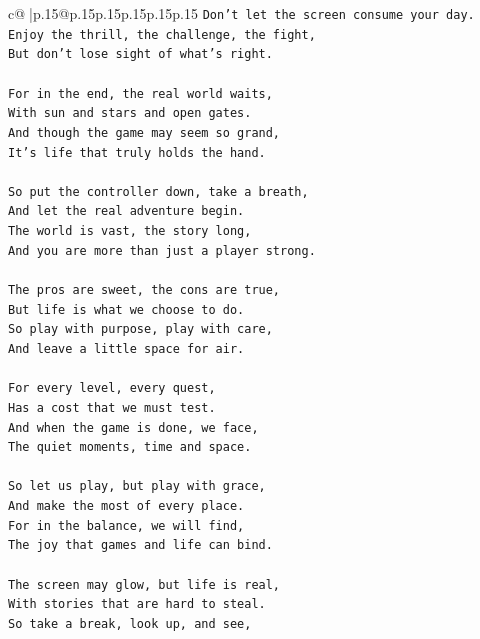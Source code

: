 \documentclass{article}
\begin{document}
{\begin{supertabular}{c@{$\;$}|p{.15\linewidth}@{}p{.15\linewidth}p{.15\linewidth}p{.15\linewidth}p{.15\linewidth}p{.15\linewidth}}
{{{\texttt{Don't let the screen consume your day.  } \\
\texttt{Enjoy the thrill, the challenge, the fight,  } \\
\texttt{But don't lose sight of what's right.  } \\
\\ 
\texttt{For in the end, the real world waits,  } \\
\texttt{With sun and stars and open gates.  } \\
\texttt{And though the game may seem so grand,  } \\
\texttt{It's life that truly holds the hand.  } \\
\\ 
\texttt{So put the controller down, take a breath,  } \\
\texttt{And let the real adventure begin.  } \\
\texttt{The world is vast, the story long,  } \\
\texttt{And you are more than just a player strong.  } \\
\\ 
\texttt{The pros are sweet, the cons are true,  } \\
\texttt{But life is what we choose to do.  } \\
\texttt{So play with purpose, play with care,  } \\
\texttt{And leave a little space for air.  } \\
\\ 
\texttt{For every level, every quest,  } \\
\texttt{Has a cost that we must test.  } \\
\texttt{And when the game is done, we face,  } \\
\texttt{The quiet moments, time and space.  } \\
\\ 
\texttt{So let us play, but play with grace,  } \\
\texttt{And make the most of every place.  } \\
\texttt{For in the balance, we will find,  } \\
\texttt{The joy that games and life can bind.  } \\
\\ 
\texttt{The screen may glow, but life is real,  } \\
\texttt{With stories that are hard to steal.  } \\
\texttt{So take a break, look up, and see,  } \\
}}}
\end{supertabular}}
\end{document}
